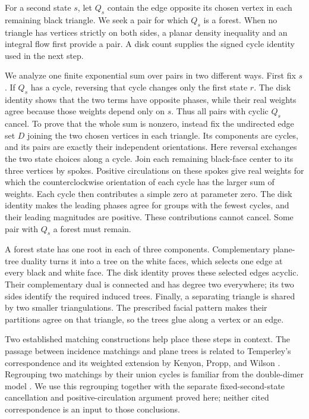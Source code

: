 \documentclass[11pt]{article}
\theoremstyle{remark}
\numberwithin{equation}{section}
\begin{document}
For a second state \(s\), let \(Q_s\) contain the edge opposite its
chosen vertex in each remaining black triangle. We seek a pair for which
\(Q_s\) is a forest. When no triangle has vertices strictly on both sides,
a planar density inequality and an integral flow first provide a pair.
A disk count supplies the signed cycle identity used in the next step.

We analyze one finite exponential sum over pairs in two different ways.
First fix \(s\). If \(Q_s\) has a cycle, reversing that cycle changes
only the first state \(r\). The disk identity shows that the two terms
have opposite phases, while their real weights agree because those
weights depend only on \(s\). Thus all pairs with cyclic \(Q_s\) cancel.
To prove that the whole sum is nonzero, instead fix the undirected edge
set \(D\) joining the two chosen vertices in each triangle. Its components
are cycles, and its pairs are exactly their independent orientations.
Here reversal exchanges the two state choices along a cycle. Join each
remaining black-face center to its three vertices by spokes. Positive circulations
on these spokes give real weights for which the counterclockwise
orientation of each cycle has the larger sum of weights.
Each cycle then contributes a simple zero at parameter zero. The disk
identity makes the leading phases agree for groups with the fewest
cycles, and their leading magnitudes are positive. These contributions
cannot cancel. Some pair with \(Q_s\) a forest must remain.

A forest state has one root in each of three components. Complementary
plane-tree duality turns it into a tree on the white faces, which selects
one edge at every black and white face. The disk identity proves these
selected edges acyclic. Their complementary dual is connected and
has degree two everywhere; its two sides identify the required induced
trees. Finally, a separating triangle is shared by two smaller
triangulations. The prescribed facial pattern makes their partitions
agree on that triangle, so the trees glue along a vertex or an edge.

Two established matching constructions help place these steps in
context. The passage between incidence matchings and plane trees
is related to Temperley's correspondence and its weighted extension
by Kenyon, Propp, and Wilson \cite{KPW2000}. Regrouping two matchings
by their union cycles is familiar from the double-dimer model
\cite[Lemma~1]{Kenyon2014}. We use this regrouping together with the
separate fixed-second-state cancellation and positive-circulation
argument proved here; neither cited correspondence is an input to
those conclusions.
\end{document}

